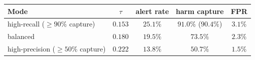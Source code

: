 \begin{tabular}{@{}lcccc@{}}
\toprule
Mode & $\tau$ & alert rate & harm capture & FPR \\
\midrule
high-recall ($\ge 90\%$ capture)    & $0.153$ & $25.1\%$ & $91.0\%$ ($90.4\%$) & $3.1\%$ \\
balanced                            & $0.180$ & $19.5\%$ & $73.5\%$            & $2.3\%$ \\
high-precision ($\ge 50\%$ capture) & $0.222$ & $13.8\%$ & $50.7\%$            & $1.5\%$ \\
\bottomrule
\end{tabular}
